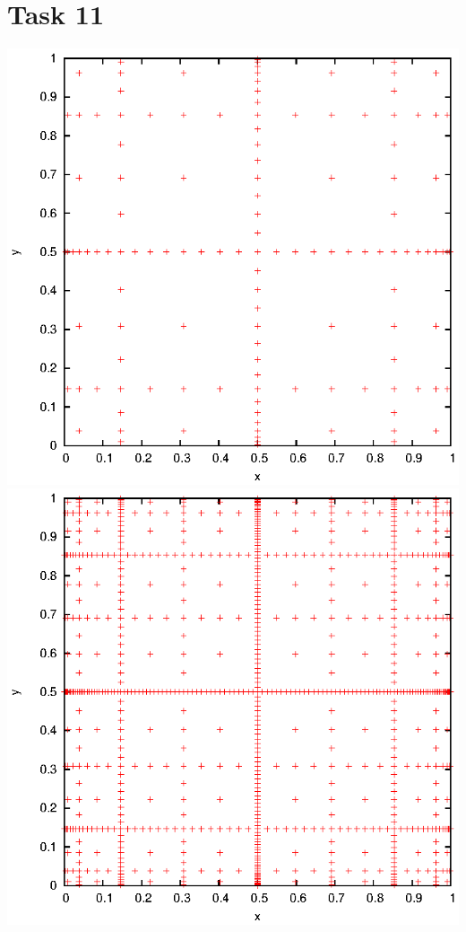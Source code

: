 \documentclass[]{article}
\begin{document}
\section*{Task 11}
\includegraphics{task11_cc5}\\
\includegraphics{task11_cc7}\\
\end{document}
